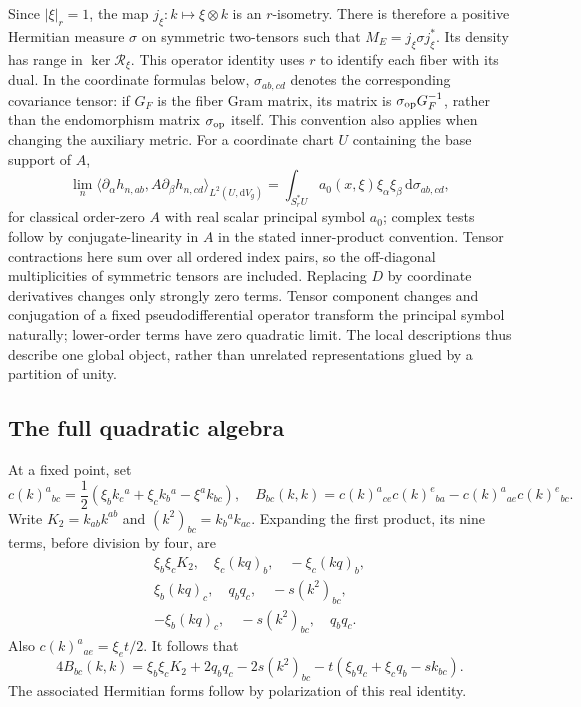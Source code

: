 \documentclass[11pt,a4paper]{article}
\numberwithin{equation}{section}
\newcommand{\dd}{\mathrm d}
\newcommand{\dV}{\dd V_g}
\newcommand{\ip}[2]{\langle #1,#2\rangle}
\newcommand{\f}[2]{\frac{#1}{#2}}
\theoremstyle{definition}
\begin{document}
Since $|\xi|_r=1$, the map $j_\xi:k\mapsto\xi\otimes k$ is an $r$-isometry. There is therefore a positive Hermitian measure $\sigma$ on symmetric two-tensors such that $M_E=j_\xi\sigma j_\xi^*$. Its density has range in $\ker\mathcal R_\xi$. This operator identity uses $r$ to identify each fiber with its dual. In the coordinate formulas below, $\sigma_{ab,cd}$ denotes the corresponding covariance tensor: if $G_F$ is the fiber Gram matrix, its matrix is $\sigma_{\rm op}G_F^{-1}$, rather than the endomorphism matrix $\sigma_{\rm op}$ itself. This convention also applies when changing the auxiliary metric. For a coordinate chart $U$ containing the base support of $A$,
\begin{equation}\label{eq:sigma}
\lim_n\ip{\partial_\alpha h_{n,ab}}{A\partial_\beta h_{n,cd}}_{L^2(U,\dV)}
=\int_{S_r^*U} a_0(x,\xi)\xi_\alpha\xi_\beta\,\dd\sigma_{ab,cd},
\end{equation}
for classical order-zero $A$ with real scalar principal symbol $a_0$;
complex tests follow by conjugate-linearity in $A$ in the stated
inner-product convention. Tensor contractions here sum over all ordered index pairs, so the off-diagonal multiplicities of symmetric tensors are included. Replacing $D$ by coordinate derivatives changes only strongly zero terms. Tensor component changes and conjugation of a fixed pseudodifferential operator transform the principal symbol naturally; lower-order terms have zero quadratic limit. The local descriptions thus describe one global object, rather than unrelated representations glued by a partition of unity.

\subsection{The full quadratic algebra}

At a fixed point, set
\begin{equation*}
c(k)^a{}_{bc}=\f12(\xi_bk_c{}^a+\xi_ck_b{}^a-\xi^ak_{bc}),\quad
B_{bc}(k,k)=c(k)^a{}_{ce}c(k)^e{}_{ba}-c(k)^a{}_{ae}c(k)^e{}_{bc}.
\end{equation*}
Write $K_2=k_{ab}k^{ab}$ and $(k^2)_{bc}=k_b{}^ak_{ac}$. Expanding the first product, its nine terms, before division by four, are
\begin{equation*}
\begin{gathered}
\xi_b\xi_cK_2,\quad \xi_c(kq)_b,\quad-\xi_c(kq)_b,\\
\xi_b(kq)_c,\quad q_bq_c,\quad-s(k^2)_{bc},\\
-\xi_b(kq)_c,\quad-s(k^2)_{bc},\quad q_bq_c.
\end{gathered}
\end{equation*}
Also $c(k)^a{}_{ae}=\xi_et/2$. It follows that
\begin{equation}\label{eq:B-algebra}
4B_{bc}(k,k)=\xi_b\xi_cK_2+2q_bq_c-2s(k^2)_{bc}
-t(\xi_bq_c+\xi_cq_b-sk_{bc}).
\end{equation}
The associated Hermitian forms follow by polarization of this real identity.
\end{document}
